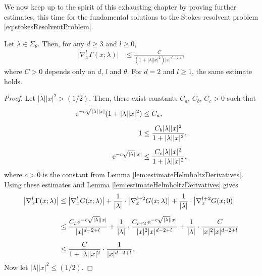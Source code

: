   We now keep up to the spirit of this exhausting chapter by proving further estimates, this time for the fundamental solutions to the Stokes resolvent problem \eqref{eq:stokesResolventProblem}.

\begin{thm}
  \label{thm:fundamentalMatrixEstimate}
  Let $\lambda \in \Sigma_\theta$.
  Then, for any $d \geq 3$ and $l \geq 0$,
  \begin{align}
    \label{eq:fundamentalMatrixEstimate}
    \big| \nabla_x^l \Gamma(x; \lambda) \big| &\leq \frac{C}{(1 + |\lambda||x|^2) |x|^{d - 2 + l}} 
  \end{align}
    where $C > 0$ depends only on $d$, $l$ and $\theta$. For $d = 2$ and $l \geq 1$, the same estimate holds.
\end{thm}

  \begin{proof}
    Let $|\lambda| |x|^2 > (1/2)$. 
    Then, there exist constants $C_a$, $C_b$, $C_c > 0$ such that
    \begin{align*}
      \mathrm{e}^{-c \sqrt{|\lambda|} |x|} ( 1 + |\lambda| |x|^2) &\leq C_a, \\[0.5em]
      1 &\leq \frac{C_b |\lambda| |x|^2}{1 + |\lambda| |x|^2}, \\[0.5em]
      \mathrm{e}^{-c \sqrt{|\lambda|} |x|} &\leq \frac{ C_c |\lambda| |x|^2}{1 + |\lambda| |x|^2},
    \end{align*}
    where $c > 0$ is the constant from Lemma \ref{lem:estimateHelmholtzDerivatives}.
    Using these estimates and Lemma \ref{lem:estimateHelmholtzDerivatives} gives
    \begin{align*}
      \big|\nabla_x^l \Gamma(x; \lambda) \big|
      &\leq \big|\nabla_x^l G(x; \lambda)\big| + \frac{1}{|\lambda|}\cdot \big|\nabla_x^{l + 2} G(x; \lambda) \big| + \frac{1}{|\lambda|} \cdot \big|\nabla_x^{l + 2} G(x; 0)\big| \\[0.5em]
      &\leq\frac{C_l\, \mathrm{e}^{-c \sqrt{|\lambda|} |x|}}{|x|^{d - 2 + l}} + \frac{1}{|\lambda|} \cdot \frac{C_{l + 2}\, \mathrm{e}^{-c \sqrt{|\lambda|} |x|}}{|x|^2 |x|^{d - 2 + l}} + \frac{1}{|\lambda|} \cdot \frac{C}{|x|^2 |x|^{d - 2 + l}} \\[0.5em]
    &\leq \frac{C}{1 + |\lambda| |x|^2} \cdot \frac{1}{|x|^{d - 2 + l}}.
    \end{align*}
    Now let $|\lambda| |x|^2 \leq ({1}/{2})$.

\end{proof}
